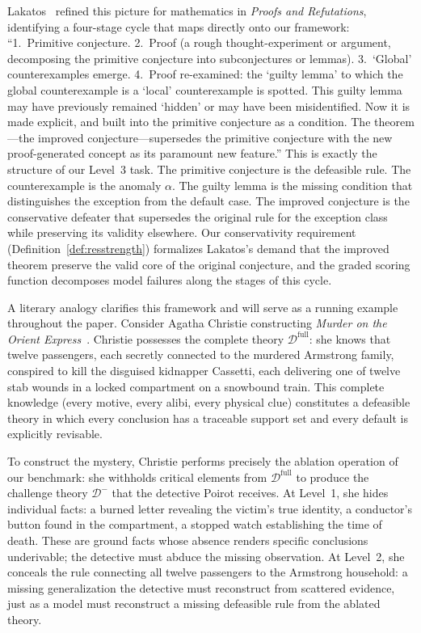 \documentclass{article}
\theoremstyle{definition}
\newcommand{\Dm}{\mathcal{D}^{-}}
\newcommand{\Dfull}{\mathcal{D}^{\mathrm{full}}}
\begin{document}
Lakatos~\cite{lakatos1976proofs} refined this picture for mathematics in \emph{Proofs and Refutations}, identifying a four-stage cycle that maps directly onto our framework: ``1.~Primitive conjecture. 2.~Proof (a rough thought-experiment or argument, decomposing the primitive conjecture into subconjectures or lemmas). 3.~`Global' counterexamples emerge. 4.~Proof re-examined: the `guilty lemma' to which the global counterexample is a `local' counterexample is spotted. This guilty lemma may have previously remained `hidden' or may have been misidentified. Now it is made explicit, and built into the primitive conjecture as a condition. The theorem---the improved conjecture---supersedes the primitive conjecture with the new proof-generated concept as its paramount new feature.'' This is exactly the structure of our Level~3 task. The primitive conjecture is the defeasible rule. The counterexample is the anomaly $\alpha$. The guilty lemma is the missing condition that distinguishes the exception from the default case. The improved conjecture is the conservative defeater that supersedes the original rule for the exception class while preserving its validity elsewhere. Our conservativity requirement (Definition~\ref{def:resstrength}) formalizes Lakatos's demand that the improved theorem preserve the valid core of the original conjecture, and the graded scoring function decomposes model failures along the stages of this cycle.

A literary analogy clarifies this framework and will serve as a running example throughout the paper. Consider Agatha Christie constructing \emph{Murder on the Orient Express}~\cite{christie1934murder}. Christie possesses the complete theory $\Dfull$: she knows that twelve passengers, each secretly connected to the murdered Armstrong family, conspired to kill the disguised kidnapper Cassetti, each delivering one of twelve stab wounds in a locked compartment on a snowbound train. This complete knowledge (every motive, every alibi, every physical clue) constitutes a defeasible theory in which every conclusion has a traceable support set and every default is explicitly revisable.

To construct the mystery, Christie performs precisely the ablation operation of our benchmark: she withholds critical elements from $\Dfull$ to produce the challenge theory $\Dm$ that the detective Poirot receives. At Level~1, she hides individual facts: a burned letter revealing the victim's true identity, a conductor's button found in the compartment, a stopped watch establishing the time of death. These are ground facts whose absence renders specific conclusions underivable; the detective must abduce the missing observation. At Level~2, she conceals the rule connecting all twelve passengers to the Armstrong household: a missing generalization the detective must reconstruct from scattered evidence, just as a model must reconstruct a missing defeasible rule from the ablated theory.
\end{document}
